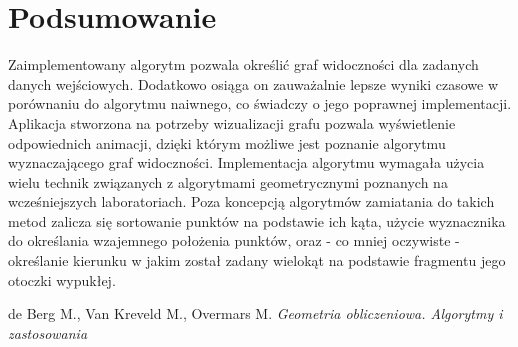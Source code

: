 \documentclass{article}
\begin{document}
\section{Podsumowanie}
\qquad Zaimplementowany algorytm pozwala określić graf widoczności dla zadanych danych wejściowych. Dodatkowo osiąga on zauważalnie lepsze wyniki czasowe w porównaniu do algorytmu naiwnego, co świadczy o jego poprawnej implementacji.  Aplikacja stworzona na potrzeby wizualizacji grafu pozwala wyświetlenie odpowiednich animacji, dzięki którym możliwe jest poznanie algorytmu wyznaczającego graf widoczności. Implementacja algorytmu wymagała użycia wielu technik związanych z algorytmami geometrycznymi poznanych na wcześniejszych laboratoriach. Poza koncepcją algorytmów zamiatania do takich metod zalicza się sortowanie punktów na podstawie ich kąta, użycie wyznacznika do określania wzajemnego położenia punktów, oraz - co mniej oczywiste - określanie kierunku w jakim został zadany wielokąt na podstawie fragmentu jego otoczki wypukłej.


\begin{thebibliography}{9}
de Berg M., Van Kreveld M., Overmars M. \emph{Geometria obliczeniowa. Algorytmy i zastosowania}
\end{thebibliography}
\end{document}
